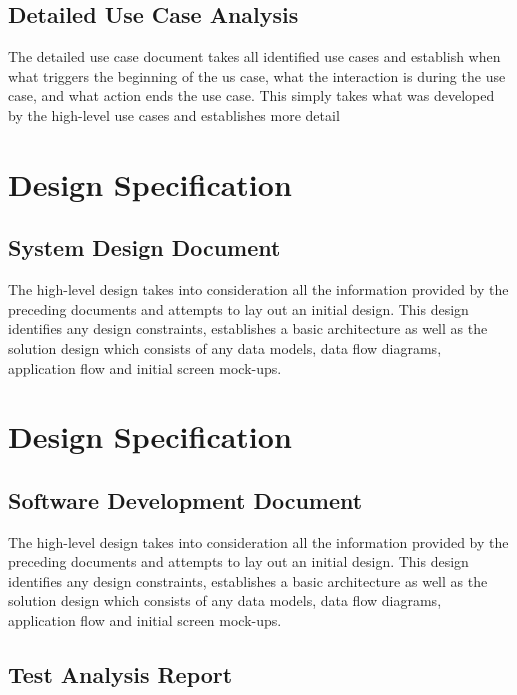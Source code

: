\documentclass[a4paper,12pt]{article}
\begin{document}
\subsection {Detailed Use Case Analysis}
The detailed use case document takes all identified use cases and establish when what triggers the
beginning of the us case, what the interaction is during the use case, and what action ends the use case.  This simply takes what
was developed by the high-level use cases and establishes more detail

\section {Design Specification}
\subsection {System Design Document}

The high-level design takes into consideration all the information provided by the preceding documents
and attempts to lay out an initial design.  This design identifies any design constraints, establishes a basic architecture as well as
the solution design which consists of any data models, data flow diagrams, application flow and initial screen mock-ups.




\section {Design Specification}
\subsection {Software Development Document}

The high-level design takes into consideration all the information provided by the preceding documents
and attempts to lay out an initial design.  This design identifies any design constraints, establishes a basic architecture as well as
the solution design which consists of any data models, data flow diagrams, application flow and initial screen mock-ups.
\subsection {Test Analysis Report}
\end{document}
